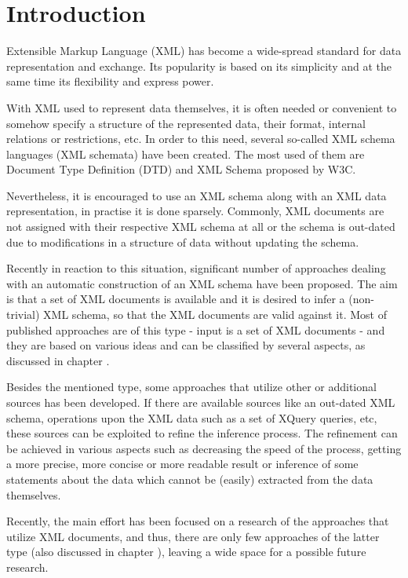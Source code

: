 \chapter{Introduction}
Extensible Markup Language (XML) has become a wide-spread standard for data representation and exchange. Its popularity is based on its simplicity and at the same time its flexibility and express power.

With XML used to represent data themselves, it is often needed or convenient to somehow specify a structure of the represented data, their format, internal relations or restrictions, etc. In order to this need, several so-called XML schema languages (XML schemata) have been created. The most used of them are Document Type Definition (DTD) and XML Schema proposed by W3C.

Nevertheless, it is encouraged to use an XML schema along with an XML data representation, in practise it is done sparsely. Commonly, XML documents are not assigned with their respective XML schema at all or the schema is out-dated due to modifications in a structure of data without updating the schema.

Recently in reaction to this situation, significant number of approaches dealing with an automatic construction of an XML schema have been proposed. The aim is that a set of XML documents is available and it is desired to infer a (non-trivial) XML schema, so that the XML documents are valid against it. Most of published approaches are of this type - input is a set of XML documents - and they are based on various ideas and can be classified by several aspects, as discussed in chapter .

Besides the mentioned type, some approaches that utilize other or additional sources has been developed. If there are available sources like an out-dated XML schema, operations upon the XML data such as a set of XQuery queries, etc, these sources can be exploited to refine the inference process. The refinement can be achieved in various aspects such as decreasing the speed of the process, getting a more precise, more concise or more readable result or inference of some statements about the data which cannot be (easily) extracted from the data themselves.

Recently, the main effort has been focused on a research of the approaches that utilize XML documents, and thus, there are only few approaches of the latter type (also discussed in chapter ), leaving a wide space for a possible future research.

